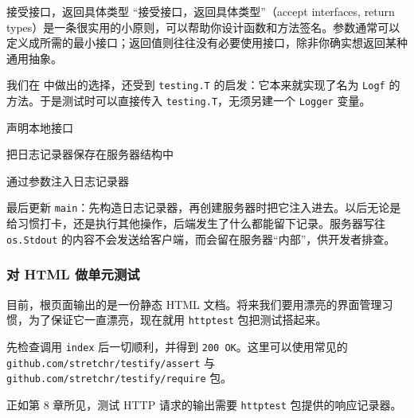\begin{tipbox}{接受接口，返回具体类型}
“接受接口，返回具体类型”（accept interfaces, return types）是一条很实用的小原则，可以帮助你设计函数和方法签名。参数通常可以定义成所需的最小接口；返回值则往往没有必要使用接口，除非你确实想返回某种通用抽象。
\end{tipbox}

我们在  中做出的选择，还受到 \texttt{testing.T} 的启发：它本来就实现了名为 \texttt{Logf} 的方法。于是测试时可以直接传入 \texttt{testing.T}，无须另建一个 \texttt{Logger} 变量。


\begin{codeannotations}
\item 声明本地接口
\item 把日志记录器保存在服务器结构中
\item 通过参数注入日志记录器
\end{codeannotations}

最后更新 \texttt{main}：先构造日志记录器，再创建服务器时把它注入进去。以后无论是给习惯打卡，还是执行其他操作，后端发生了什么都能留下记录。服务器写往 \texttt{os.Stdout} 的内容不会发送给客户端，而会留在服务器“内部”，供开发者排查。

\subsubsection{对 HTML 做单元测试}

目前，根页面输出的是一份静态 HTML 文档。将来我们要用漂亮的界面管理习惯，为了保证它一直漂亮，现在就用 \texttt{httptest} 包把测试搭起来。

先检查调用 \texttt{index} 后一切顺利，并得到 \texttt{200 OK}。这里可以使用常见的 \texttt{github.com/stretchr/testify/assert} 与 \texttt{github.com/stretchr/testify/require} 包。

正如第 8 章所见，测试 HTTP 请求的输出需要 \texttt{httptest} 包提供的响应记录器。


